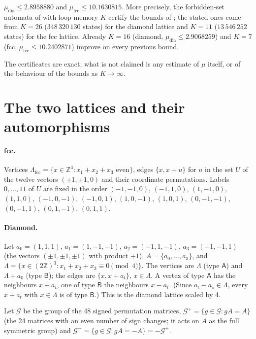 \documentclass[11pt,a4paper]{report}
\newcommand*{\fcc}{\mathrm{fcc}}
\newcommand*{\dia}{\mathrm{dia}}
\begin{document}
\begin{theorem}\label{thm:main}
\(\mu_\dia\le 2.8958880\) and \(\mu_\fcc\le 10.1630815\). More precisely, the forbidden-set automata of
 with loop memory \(K\) certify the bounds of ; the stated ones come from
\(K=26\) (\(348\,320\,130\) states) for the diamond lattice and \(K=11\) (\(13\,546\,252\) states) for the fcc lattice. Already
\(K=16\) (diamond, \(\mu_\dia\le2.9068259\)) and \(K=7\) (fcc, \(\mu_\fcc\le10.2402871\)) improve on every previous bound.
\end{theorem}

The certificates are exact; what is not claimed is any estimate of \(\mu\) itself, or of the behaviour of the bounds
as \(K\to\infty\).

\section{The two lattices and their automorphisms}\label{sec:lattices}

\paragraph{fcc.} Vertices \(\Lambda_\fcc=\{x\in\mathbb Z^3:x_1+x_2+x_3\text{ even}\}\), edges \(\{x,x+u\}\) for \(u\) in the
set \(U\) of the twelve vectors \((\pm1,\pm1,0)\) and their coordinate permutations. Labels \(0,\dots,11\) of \(U\) are
fixed in the order \((-1,-1,0)\), \((-1,1,0)\), \((1,-1,0)\), \((1,1,0)\), \((-1,0,-1)\), \((-1,0,1)\), \((1,0,-1)\),
\((1,0,1)\), \((0,-1,-1)\), \((0,-1,1)\), \((0,1,-1)\), \((0,1,1)\).

\paragraph{Diamond.} Let \(a_0=(1,1,1)\), \(a_1=(1,-1,-1)\), \(a_2=(-1,1,-1)\), \(a_3=(-1,-1,1)\) (the vectors
\((\pm1,\pm1,\pm1)\) with product \(+1\)), \(A=\{a_0,\dots,a_3\}\), and
\(\Lambda=\{x\in(2\mathbb Z)^3:x_1+x_2+x_3\equiv0\pmod4\}\). The vertices are \(\Lambda\) (type \(\mathsf A\)) and
\(\Lambda+a_0\) (type \(\mathsf B\)); the edges are \(\{x,x+a_t\}\), \(x\in\Lambda\). A vertex of type \(\mathsf A\) has
the neighbours \(x+a_t\), one of type \(\mathsf B\) the neighbours \(x-a_t\). (Since \(a_t-a_s\in\Lambda\), every
\(x+a_t\) with \(x\in\Lambda\) is of type \(\mathsf B\).) This is the diamond lattice scaled by 4.

Let \(\mathcal G\) be the group of the 48 signed permutation matrices, \(\mathcal G^+=\{g\in\mathcal G:gA=A\}\) (the 24
matrices with an even number of sign changes; it acts on \(A\) as the full symmetric group) and
\(\mathcal G^-=\{g\in\mathcal G:gA=-A\}=-\mathcal G^+\).
\end{document}
